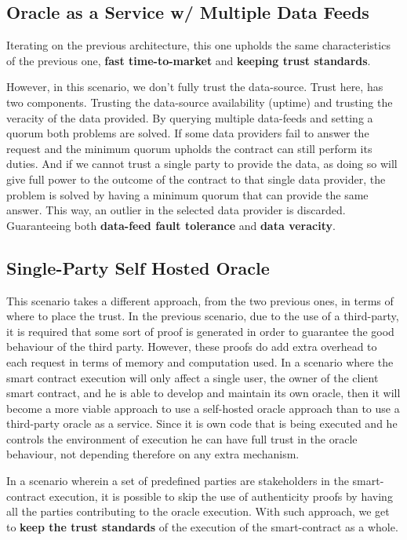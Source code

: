\subsection{Oracle as a Service w/ Multiple Data Feeds}\label{OaaS w/ MDF}
Iterating on the previous architecture, this one upholds the same characteristics of the previous one, \textbf{fast time-to-market} and \textbf{keeping trust standards}.

However, in this scenario, we don't fully trust the data-source. Trust here, has two components. Trusting the data-source availability (uptime) and trusting the veracity of the data provided. By querying multiple data-feeds and setting a quorum both problems are solved. If some data providers fail to answer the request and the minimum quorum upholds the contract can still perform its duties. And if we cannot trust a single party to provide the data, as doing so will give full power to the outcome of the contract to that single data provider, the problem is solved by having a minimum quorum that can provide the same answer. This way, an outlier in the selected data provider is discarded. Guaranteeing both \textbf{data-feed fault tolerance} and \textbf{data veracity}.

\subsection{Single-Party Self Hosted Oracle}\label{SP-SHO}
This scenario takes a different approach, from the two previous ones, in terms of where to place the trust. In the previous scenario, due to the use of a third-party, it is required that some sort of proof is generated in order to guarantee the good behaviour of the third party. However, these proofs do add extra overhead to each request in terms of memory and computation used. In a scenario where the smart contract execution will only affect a single user, the owner of the client smart contract, and he is able to develop and maintain its own oracle, then it will become a more viable approach to use a self-hosted oracle approach than to use a third-party oracle as a service. Since it is own code that is being executed and he controls the environment of execution he can have full trust in the oracle behaviour, not depending therefore on any extra mechanism.


In a scenario wherein a set of predefined parties are stakeholders in the smart-contract execution, it is possible to skip the use of authenticity proofs by having all the parties contributing to the oracle execution. With such approach, we get to \textbf{keep the trust standards} of the execution of the smart-contract as a whole.

